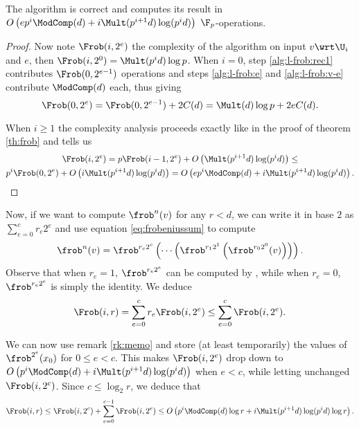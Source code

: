 \sloppy
\begin{theorem}
  \label{th:l-frob}
  The algorithm  is correct and computes
  its result in
  $O\left(ep^i\ModComp(d) + i\Mult(p^{i+1}d)\log(p^id)\right)$
  $\F_p$-operations.
\end{theorem}
\fussy
\begin{proof}
  Now note $\Frob(i,2^e)$ the complexity of the algorithm on input
  $v\wrt\U_i$ and $e$, then $\Frob(i,2^0) = \Mult(p^id)\log p$.
  When $i=0$, step \ref{alg:l-frob:rec1} contributes
  $\Frob(0,2^{e-1})$ operations and steps \ref{alg:l-frob:e} and
  \ref{alg:l-frob:v-e} contribute $\ModComp(d)$ each, thus giving
  \begin{equation*}
    \Frob(0,2^e) = \Frob(0,2^{e-1}) + 2C(d) = 
    \Mult(d)\log p+2eC(d).
  \end{equation*}

  When $i\ge1$ the complexity analysis proceeds exactly like in the
  proof of theorem \ref{th:frob} and tells us
  \begin{multline*}
    \Frob(i,2^e) =
    p\Frob(i-1,2^e) + O\left(\Mult(p^{i+1}d)\log(p^id)\right)\le\\
    p^i\Frob(0,2^e) + O\left(i\Mult(p^{i+1}d)\log(p^id)\right) =
    O\left(ep^i\ModComp(d) + i\Mult(p^{i+1}d)\log(p^id)\right).
  \end{multline*}
\end{proof}


Now, if we want to compute $\frob^n(v)$ for any $r<d$, we can write it
in base $2$ as $\sum_{e=0}^cr_e2^e$ and use equation
\eqref{eq:frobeniussum} to compute
\begin{equation*}
  \frob^{n}(v) =
  \frob^{r_c2^c}\left(\cdots\left(\frob^{r_12^1}\left(\frob^{r_02^0}(v)\right)\right)\right)
  .
\end{equation*}
Observe that when $r_e=1$, $\frob^{r_e2^e}$ can be computed by
, while when $r_e=0$, $\frob^{r_e2^e}$
is simply the identity. We deduce
\begin{equation*}
  \Frob(i,r) = \sum_{e=0}^cr_e\Frob(i,2^e)\le
  \sum_{e=0}^{c}\Frob(i,2^e)
  .
\end{equation*}

We can now use remark \ref{rk:memo} and store (at least temporarily)
the values of $\frob^{2^e}(x_0)$ for $0\le e<c$. This makes
$\Frob(i,2^e)$ drop down to $O\left(p^i\ModComp(d) +
i\Mult(p^{i+1}d)\log(p^id)\right)$ when $e<c$, while letting unchanged
$\Frob(i,2^c)$.  Since $c\le\log_2r$, we deduce that
\begin{equation*}
  \Frob(i,r) \le \Frob(i,2^c) + \sum_{e=0}^{c-1}\Frob(i,2^e)\le
  O\left(p^i\ModComp(d)\log r + i\Mult(p^{i+1}d)\log(p^id)\log r\right).
\end{equation*}

